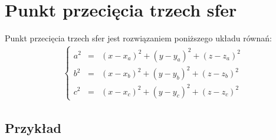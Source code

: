 \documentclass{article}
\begin{document}
\section{Punkt przecięcia trzech sfer}

Punkt przecięcia trzech sfer jest rozwiązaniem poniższego układu równań:
\begin{align}
\left\{\begin{array}{rcl}
a^2 &=& (x-x_a)^2 + (y-y_a)^2 + (z-z_a)^2 \\ 
b^2 &=& (x-x_b)^2 + (y-y_b)^2 + (z-z_b)^2 \\ 
c^2 &=& (x-x_c)^2 + (y-y_c)^2 + (z-z_c)^2 
\end{array}\right.
\end{align}

\subsection{Przykład}
\end{document}
